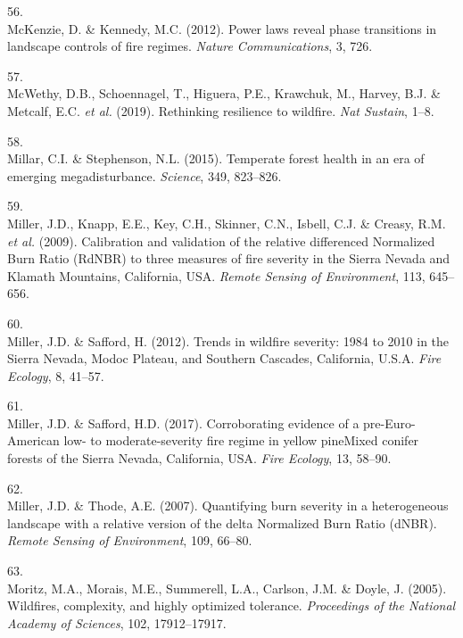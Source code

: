 \documentclass[]{article}
\begin{document}
\leavevmode\hypertarget{ref-mckenzie2012}{}%
56.\\
McKenzie, D. \& Kennedy, M.C. (2012). Power laws reveal phase
transitions in landscape controls of fire regimes. \emph{Nature
Communications}, 3, 726.

\leavevmode\hypertarget{ref-mcwethy2019}{}%
57.\\
McWethy, D.B., Schoennagel, T., Higuera, P.E., Krawchuk, M., Harvey,
B.J. \& Metcalf, E.C. \emph{et al.} (2019). Rethinking resilience to
wildfire. \emph{Nat Sustain}, 1--8.

\leavevmode\hypertarget{ref-millar2015}{}%
58.\\
Millar, C.I. \& Stephenson, N.L. (2015). Temperate forest health in an
era of emerging megadisturbance. \emph{Science}, 349, 823--826.

\leavevmode\hypertarget{ref-miller2009a}{}%
59.\\
Miller, J.D., Knapp, E.E., Key, C.H., Skinner, C.N., Isbell, C.J. \&
Creasy, R.M. \emph{et al.} (2009). Calibration and validation of the
relative differenced Normalized Burn Ratio (RdNBR) to three measures of
fire severity in the Sierra Nevada and Klamath Mountains, California,
USA. \emph{Remote Sensing of Environment}, 113, 645--656.

\leavevmode\hypertarget{ref-miller2012a}{}%
60.\\
Miller, J.D. \& Safford, H. (2012). Trends in wildfire severity: 1984 to
2010 in the Sierra Nevada, Modoc Plateau, and Southern Cascades,
California, U.S.A. \emph{Fire Ecology}, 8, 41--57.

\leavevmode\hypertarget{ref-miller2017}{}%
61.\\
Miller, J.D. \& Safford, H.D. (2017). Corroborating evidence of a
pre-Euro-American low- to moderate-severity fire regime in yellow
pineMixed conifer forests of the Sierra Nevada, California, USA.
\emph{Fire Ecology}, 13, 58--90.

\leavevmode\hypertarget{ref-miller2007}{}%
62.\\
Miller, J.D. \& Thode, A.E. (2007). Quantifying burn severity in a
heterogeneous landscape with a relative version of the delta Normalized
Burn Ratio (dNBR). \emph{Remote Sensing of Environment}, 109, 66--80.

\leavevmode\hypertarget{ref-moritz2005}{}%
63.\\
Moritz, M.A., Morais, M.E., Summerell, L.A., Carlson, J.M. \& Doyle, J.
(2005). Wildfires, complexity, and highly optimized tolerance.
\emph{Proceedings of the National Academy of Sciences}, 102,
17912--17917.
\end{document}
